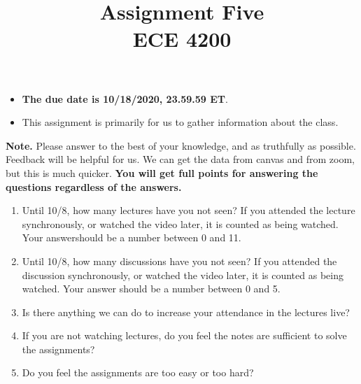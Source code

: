 \documentclass[11pt]{article}
\title{Assignment Five\\ ECE 4200}
\date{}
\newenvironment{problem}[2][Problem]{\begin{trivlist}
\item[\hskip \labelsep {\bfseries #1}\hskip \labelsep {\bfseries #2.}]}{\end{trivlist}}
\begin{document}
\maketitle 


\begin{itemize}

\item
{\bf The due date is 10/18/2020, 23.59.59 ET}. 
\item
This assignment is primarily for us to gather information about the class. 
\end{itemize}


\noindent\textbf{Note.} Please answer to the best of your knowledge, and as truthfully as possible. Feedback will be helpful for us. We can get the data from canvas and from zoom, but this is much quicker. \textbf{You will get full points for answering the questions regardless of the answers.}

\begin{problem}{1. (25 points)}
\begin{enumerate}
\item 
 Until 10/8, how many lectures have you not seen? If you attended the lecture synchronously, or watched the video later, it is counted as being watched. Your answershould be a number between 0 and 11. 
\item
 Until 10/8, how many discussions have you not seen? If you attended the discussion synchronously, or watched the video later, it is counted as being watched. Your answer should be a number between 0 and 5. 
\item 
Is there anything we can do to increase your attendance in the lectures live?
\item
If you are not watching lectures, do you feel the notes are sufficient to solve the assignments?
\item
Do you feel the assignments are too easy or too hard?
\end{enumerate}

\end{problem}
\end{document}
